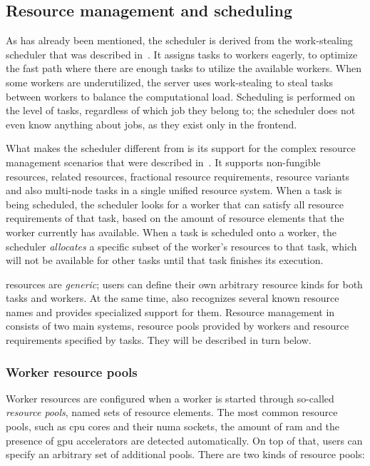 \subsection{Resource management and scheduling}
\label{sec:hq-resource-management}
As has already been mentioned, the \hyperqueue{} scheduler is derived from the
\rsds{} work-stealing scheduler that was described in~. It
assigns tasks to workers eagerly, to optimize the fast path where there are enough tasks to utilize
the available workers. When some workers are underutilized, the server uses work-stealing to steal
tasks between workers to balance the computational load. Scheduling is performed on the level of
tasks, regardless of which job they belong to; the scheduler does not even know anything about
jobs, as they exist only in the frontend.

What makes the scheduler different from \rsds{} is its support for the complex
resource management scenarios that were described in~. It supports
non-fungible resources, related resources, fractional resource requirements, resource variants and
also multi-node tasks in a single unified resource system. When a task is being scheduled, the
scheduler looks for a worker that can satisfy all resource requirements of that task, based on the
amount of resource elements that the worker currently has available. When a task is scheduled onto
a worker, the scheduler \emph{allocates} a specific subset of the worker's resources to that
task, which will not be available for other tasks until that task finishes its execution.

\hyperqueue{} resources are \emph{generic}; users can define their own
arbitrary resource kinds for both tasks and workers. At the same time, \hq{} also
recognizes several known resource names and provides specialized support for them. Resource
management in \hyperqueue{} consists of two main systems, resource pools provided by
workers and resource requirements specified by tasks. They will be described in turn below.

\subsubsection*{Worker resource pools}
Worker resources are configured when a worker is started through so-called \emph{resource pools},
named sets of resource elements. The most common resource pools, such as \gls{cpu}
cores and their \gls{numa} sockets, the amount of \gls{ram} and the
presence of \gls{gpu} accelerators are detected automatically. On top of that, users
can specify an arbitrary set of additional pools. There are two kinds of resource pools:

